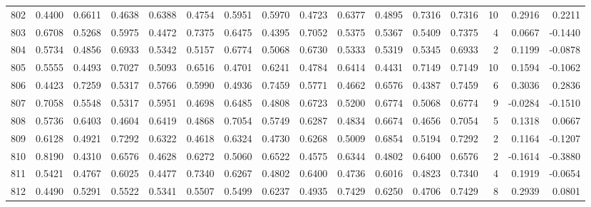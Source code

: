 \begin{tabular}{lrrrrrrrrrrrrrrr}
802 &      0.4400 &  0.6611 &  0.4638 &  0.6388 &  0.4754 &  0.5951 &  0.5970 &  0.4723 &  0.6377 &  0.4895 &   0.7316 &     0.7316 &     10 &                    0.2916 &                     0.2211 \\
803 &      0.6708 &  0.5268 &  0.5975 &  0.4472 &  0.7375 &  0.6475 &  0.4395 &  0.7052 &  0.5375 &  0.5367 &   0.5409 &     0.7375 &      4 &                    0.0667 &                    -0.1440 \\
804 &      0.5734 &  0.4856 &  0.6933 &  0.5342 &  0.5157 &  0.6774 &  0.5068 &  0.6730 &  0.5333 &  0.5319 &   0.5345 &     0.6933 &      2 &                    0.1199 &                    -0.0878 \\
805 &      0.5555 &  0.4493 &  0.7027 &  0.5093 &  0.6516 &  0.4701 &  0.6241 &  0.4784 &  0.6414 &  0.4431 &   0.7149 &     0.7149 &     10 &                    0.1594 &                    -0.1062 \\
806 &      0.4423 &  0.7259 &  0.5317 &  0.5766 &  0.5990 &  0.4936 &  0.7459 &  0.5771 &  0.4662 &  0.6576 &   0.4387 &     0.7459 &      6 &                    0.3036 &                     0.2836 \\
807 &      0.7058 &  0.5548 &  0.5317 &  0.5951 &  0.4698 &  0.6485 &  0.4808 &  0.6723 &  0.5200 &  0.6774 &   0.5068 &     0.6774 &      9 &                   -0.0284 &                    -0.1510 \\
808 &      0.5736 &  0.6403 &  0.4604 &  0.6419 &  0.4868 &  0.7054 &  0.5749 &  0.6287 &  0.4834 &  0.6674 &   0.4656 &     0.7054 &      5 &                    0.1318 &                     0.0667 \\
809 &      0.6128 &  0.4921 &  0.7292 &  0.6322 &  0.4618 &  0.6324 &  0.4730 &  0.6268 &  0.5009 &  0.6854 &   0.5194 &     0.7292 &      2 &                    0.1164 &                    -0.1207 \\
810 &      0.8190 &  0.4310 &  0.6576 &  0.4628 &  0.6272 &  0.5060 &  0.6522 &  0.4575 &  0.6344 &  0.4802 &   0.6400 &     0.6576 &      2 &                   -0.1614 &                    -0.3880 \\
811 &      0.5421 &  0.4767 &  0.6025 &  0.4477 &  0.7340 &  0.6267 &  0.4802 &  0.6400 &  0.4736 &  0.6016 &   0.4823 &     0.7340 &      4 &                    0.1919 &                    -0.0654 \\
812 &      0.4490 &  0.5291 &  0.5522 &  0.5341 &  0.5507 &  0.5499 &  0.6237 &  0.4935 &  0.7429 &  0.6250 &   0.4706 &     0.7429 &      8 &                    0.2939 &                     0.0801 \\

\end{tabular}
